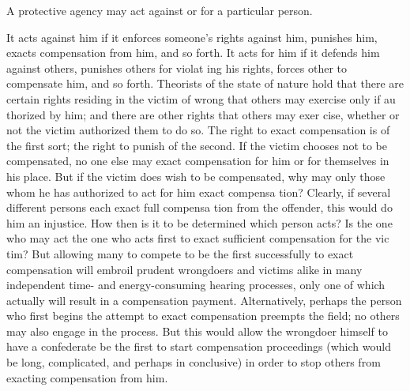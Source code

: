 \documentclass[11pt,openany]{book}
\begin{document}
A protective agency may act against or for a particular person. 

It acts against him if it enforces someone's rights against him, punishes him, exacts compensation from him, and so forth. It acts for him if it defends him against others, punishes others for violat ing his rights, forces other to compensate him, and so forth. Theorists of the state of nature hold that there are certain rights residing in the victim of wrong that others may exercise only if au thorized by him; and there are other rights that others may exer cise, whether or not the victim authorized them to do so. The right to exact compensation is of the first sort; the right to punish of the second. If the victim chooses not to be compensated, no one else may exact compensation for him or for themselves in his place. But if the victim does wish to be compensated, why may only those whom he has authorized to act for him exact compensa tion? Clearly, if several different persons each exact full compensa tion from the offender, this would do him an injustice. How then is it to be determined which person acts? Is the one who may act the one who acts first to exact sufficient compensation for the vic tim? But allowing many to compete to be the first successfully to exact compensation will embroil prudent wrongdoers and victims alike in many independent time- and energy-consuming hearing processes, only one of which actually will result in a compensation payment. Alternatively, perhaps the person who first begins the attempt to exact compensation preempts the field; no others may also engage in the process. But this would allow the wrongdoer himself to have a confederate be the first to start compensation proceedings (which would be long, complicated, and perhaps in conclusive) in order to stop others from exacting compensation from him. 
\end{document}
